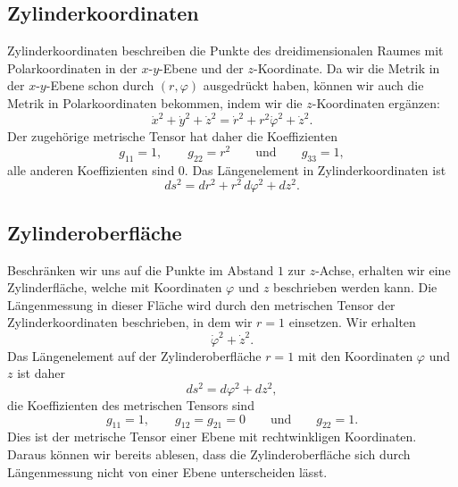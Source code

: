 \subsection{Zylinderkoordinaten}
Zylinderkoordinaten beschreiben die Punkte des dreidimensionalen
Raumes mit Polarkoordinaten in der $x$-$y$-Ebene und der $z$-Koordinate.
Da wir die Metrik in der $x$-$y$-Ebene schon durch $(r,\varphi)$
ausgedrückt haben, können wir auch die Metrik in Polarkoordinaten
bekommen, indem wir die $z$-Koordinaten ergänzen:
\[
\dot x^2+\dot y^2 +\dot z^2
=
\dot r^2 + r^2\dot\varphi^2 + \dot z^2.
\]
Der zugehörige metrische Tensor hat daher die Koeffizienten
\[
g_{11}=1,\qquad
g_{22}=r^2
\qquad\text{und}\qquad
g_{33}=1,
\]
alle anderen Koeffizienten sind $0$.
Das Längenelement in Zylinderkoordinaten ist
\[
ds^2
=
dr^2+r^2\,d\varphi^2 + dz^2.
\]

\subsection{Zylinderoberfläche}
Beschränken wir uns auf die Punkte im Abstand $1$ zur $z$-Achse, erhalten
wir eine Zylinderfläche, welche mit Koordinaten $\varphi$ und $z$
beschrieben werden kann.
Die Längenmessung in dieser Fläche wird durch den metrischen
Tensor der Zylinderkoordinaten beschrieben, in dem wir $r=1$ einsetzen.
Wir erhalten
\[
\dot\varphi^2+\dot z^2.
\]
Das Längenelement auf der Zylinderoberfläche $r=1$ mit den Koordinaten
$\varphi$ und $z$ ist daher
\[
ds^2
=
d\varphi^2+dz^2,
\]
die Koeffizienten des metrischen Tensors sind
\[
g_{11}=1,\qquad
g_{12}=g_{21}=0
\qquad\text{und}\qquad
g_{22}=1.
\]
Dies ist der metrische Tensor einer Ebene mit rechtwinkligen Koordinaten.
Daraus können wir bereits ablesen, dass die Zylinderoberfläche sich durch
Längenmessung nicht von einer Ebene unterscheiden lässt.


